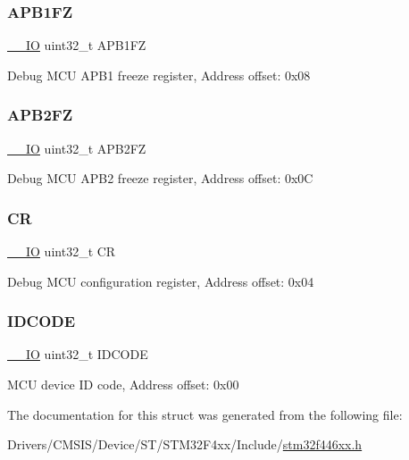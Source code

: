 \subsubsection{\texorpdfstring{A\+P\+B1\+FZ}{APB1FZ}}
{\footnotesize\ttfamily \mbox{\hyperlink{core__sc300_8h_aec43007d9998a0a0e01faede4133d6be}{\+\_\+\+\_\+\+IO}} uint32\+\_\+t A\+P\+B1\+FZ}

Debug M\+CU A\+P\+B1 freeze register, Address offset\+: 0x08 \mbox{\label{struct_d_b_g_m_c_u___type_def_a4628a8c32f97ef93b15b2b503ef90c75}} 
\subsubsection{\texorpdfstring{A\+P\+B2\+FZ}{APB2FZ}}
{\footnotesize\ttfamily \mbox{\hyperlink{core__sc300_8h_aec43007d9998a0a0e01faede4133d6be}{\+\_\+\+\_\+\+IO}} uint32\+\_\+t A\+P\+B2\+FZ}

Debug M\+CU A\+P\+B2 freeze register, Address offset\+: 0x0C \mbox{\label{struct_d_b_g_m_c_u___type_def_ab40c89c59391aaa9d9a8ec011dd0907a}} 
\subsubsection{\texorpdfstring{CR}{CR}}
{\footnotesize\ttfamily \mbox{\hyperlink{core__sc300_8h_aec43007d9998a0a0e01faede4133d6be}{\+\_\+\+\_\+\+IO}} uint32\+\_\+t CR}

Debug M\+CU configuration register, Address offset\+: 0x04 \mbox{\label{struct_d_b_g_m_c_u___type_def_a24df28d0e440321b21f6f07b3bb93dea}} 
\subsubsection{\texorpdfstring{I\+D\+C\+O\+DE}{IDCODE}}
{\footnotesize\ttfamily \mbox{\hyperlink{core__sc300_8h_aec43007d9998a0a0e01faede4133d6be}{\+\_\+\+\_\+\+IO}} uint32\+\_\+t I\+D\+C\+O\+DE}

M\+CU device ID code, Address offset\+: 0x00 

The documentation for this struct was generated from the following file\+:\begin{DoxyCompactItemize}
\item 
Drivers/\+C\+M\+S\+I\+S/\+Device/\+S\+T/\+S\+T\+M32\+F4xx/\+Include/\mbox{\hyperlink{stm32f446xx_8h}{stm32f446xx.\+h}}\end{DoxyCompactItemize}
